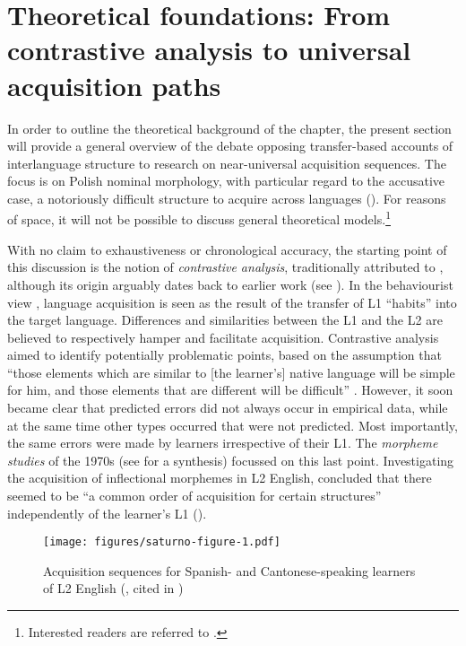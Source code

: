 \documentclass[output=paper,            colorlinks, citecolor=brown            		  ]{langscibook}
\begin{document}
\section{Theoretical foundations: From contrastive analysis to universal acquisition paths}
\label{sec:saturno:1}

In order to outline the theoretical background of the chapter, the present section will provide a general overview of the debate opposing transfer-based accounts of interlanguage structure to research on near-universal acquisition sequences. The focus is on Polish nominal morphology, with particular regard to the accusative case, a notoriously difficult structure to acquire across languages (\citealt{Artoni2020, BatenVerbeke2020, Magnani2020, Saturno2020a}). For reasons of space, it will not be possible to discuss general theoretical models.\footnote{Interested readers are referred to \citet{Bardel2019}.}

With no claim to exhaustiveness or chronological accuracy, the starting point of this discussion is the notion of \textit{contrastive analysis}, traditionally attributed to \citet{Lado1957}, although its origin arguably dates back to earlier work (see \citealt{Odlin2016}). In the behaviourist view \citep{Skinner1957}, language acquisition is seen as the result of the transfer of L1 “habits” into the target language. Differences and similarities between the L1 and the L2 are believed to respectively hamper and facilitate acquisition. Contrastive analysis aimed to identify potentially problematic points, based on the assumption that “those elements which are similar to [the learner’s] native language will be simple for him, and those elements that are different will be difficult” \citep[2]{Lado1957}. However, it soon became clear that predicted errors did not always occur in empirical data, while at the same time other types occurred that were not predicted. Most importantly, the same errors were made by learners irrespective of their L1. The  \textit{morpheme studies} of the 1970s (see \citealt{DulayEtAl1982} for a synthesis) focussed on this last point. Investigating the acquisition of inflectional morphemes in L2 English, \citet[256]{DulayBurt1973} concluded that there seemed to be “a common order of acquisition for certain structures” independently of the learner’s L1 ().

  
\begin{figure}
\texttt{[image: figures/saturno-figure-1.pdf]}

\caption{Acquisition sequences for Spanish- and Cantonese-speaking learners of L2 English (\citealt{DulayBurt1974}, cited in \citealt[206]{DulayEtAl1982})}
\label{fig:saturno:1}
\end{figure}
\end{document}
